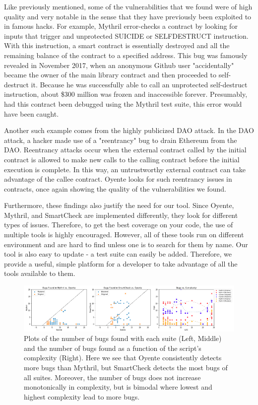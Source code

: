 Like previously mentioned, some of the vulnerabilities that we found were of high quality and very notable in the sense that they have previously been exploited to in famous hacks. For example, Mythril error-checks a contract by looking for inputs that trigger and unprotected SUICIDE or SELFDESTRUCT instruction. With this instruction, a smart contract is essentially destroyed and all the remaining balance of the contract to a specified address. This bug was famously revealed in November 2017, when an anonymous Github user "accidentally" became the owner of the main library contract and then proceeded to self-destruct it. Because he was successfully able to call an unprotected self-destruct instruction, about \$300 million was frozen and inaccessible forever. Presumably, had this contract been debugged using the Mythril test suite, this error would have been caught.  

Another such example comes from the highly publicized DAO attack. In the DAO attack, a hacker made use of a "reentrancy" bug to drain Ethereum from the DAO. Reentrancy attacks occur when the external contract called by the initial contract is allowed to make new calls to the calling contract before the initial execution is complete. In this way, an untrustworthy external contract can take advantage of the callee contract. Oyente looks for such reentrancy issues in contracts, once again showing the quality of the vulnerabilities we found. 

Furthermore, these findings also justify the need for our tool. Since Oyente, Mythril, and SmartCheck are implemented differently, they look for different types of issues. Therefore, to get the best coverage on your code, the use of multiple tools is highly encouraged. However, all of these tools run on different environment and are hard to find unless one is to search for them by name. Our tool is also easy to update - a test suite can easily be added. Therefore, we provide a useful, simple platform for a developer to take advantage of all the tools available to them.   

\begin{figure}[h!]
\centering
\includegraphics[width=7.0in]{img/Bugs2.png}
\caption{Plots of the number of bugs found with each suite (Left, Middle) and the number of bugs found as a function of the script's complexity (Right). Here we see that Oyente consistently detects more bugs than Mythril, but SmartCheck detects the most bugs of all suites. Moreover, the number of bugs does not increase monotonically in complexity, but is bimodal where lowest and highest complexity lead to more bugs.}
\label{bugs}
\end{figure}

